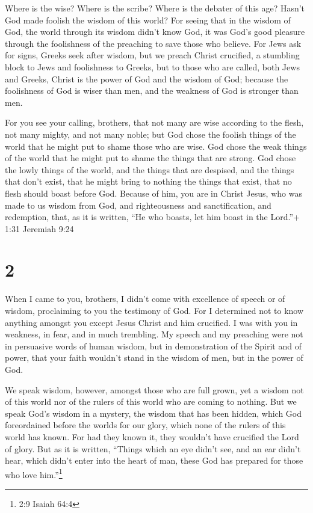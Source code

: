  Where is the wise? Where is the scribe? Where is the
debater of this age? Hasn't God made foolish the wisdom of this world?
 For seeing that in the wisdom of God, the world through
its wisdom didn't know God, it was God's good pleasure through the
foolishness of the preaching to save those who believe. 
For Jews ask for signs, Greeks seek after wisdom,  but we
preach Christ crucified, a stumbling block to Jews and foolishness to
Greeks,  but to those who are called, both Jews and Greeks,
Christ is the power of God and the wisdom of God;  because
the foolishness of God is wiser than men, and the weakness of God is
stronger than men.

 For you see your calling, brothers, that not many are wise
according to the flesh, not many mighty, and not many noble;
 but God chose the foolish things of the world that he
might put to shame those who are wise. God chose the weak things of the
world that he might put to shame the things that are strong.
 God chose the lowly things of the world, and the things
that are despised, and the things that don't exist, that he might bring
to nothing the things that exist,  that no flesh should
boast before God.  Because of him, you are in Christ Jesus,
who was made to us wisdom from God, and righteousness and
sanctification, and redemption,  that, as it is written,
``He who boasts, let him boast in the Lord.''+ 1:31 Jeremiah 9:24

\hypertarget{section-1}{%
\section{2}\label{section-1}}

 When I came to you, brothers, I didn't come with excellence
of speech or of wisdom, proclaiming to you the testimony of God.
 For I determined not to know anything amongst you except
Jesus Christ and him crucified.  I was with you in weakness,
in fear, and in much trembling.  My speech and my preaching
were not in persuasive words of human wisdom, but in demonstration of
the Spirit and of power,  that your faith wouldn't stand in
the wisdom of men, but in the power of God.

 We speak wisdom, however, amongst those who are full grown,
yet a wisdom not of this world nor of the rulers of this world who are
coming to nothing.  But we speak God's wisdom in a mystery,
the wisdom that has been hidden, which God foreordained before the
worlds for our glory,  which none of the rulers of this
world has known. For had they known it, they wouldn't have crucified the
Lord of glory.  But as it is written, ``Things which an eye
didn't see, and an ear didn't hear, which didn't enter into the heart of
man, these God has prepared for those who love him.''\footnote{2:9
  Isaiah 64:4}

